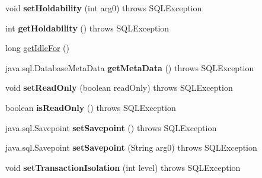 \begin{DoxyCompactItemize}
void {\bfseries set\+Holdability} (int arg0)  throws S\+Q\+L\+Exception 
\item 
\mbox{\label{classcom_1_1mysql_1_1cj_1_1jdbc_1_1_connection_wrapper_a830f2f6ec4a9c340bb0e1f45ea1190e4}} 
int {\bfseries get\+Holdability} ()  throws S\+Q\+L\+Exception 
\item 
long \mbox{\hyperlink{classcom_1_1mysql_1_1cj_1_1jdbc_1_1_connection_wrapper_a4894df9d353212ae8b4e0860c15e6a6e}{get\+Idle\+For}} ()
\item 
\mbox{\label{classcom_1_1mysql_1_1cj_1_1jdbc_1_1_connection_wrapper_ac3a18047b84616a9c5d751967464c880}} 
java.\+sql.\+Database\+Meta\+Data {\bfseries get\+Meta\+Data} ()  throws S\+Q\+L\+Exception 
\item 
\mbox{\label{classcom_1_1mysql_1_1cj_1_1jdbc_1_1_connection_wrapper_ae9150565f43b006b5f70ca1d966b2456}} 
void {\bfseries set\+Read\+Only} (boolean read\+Only)  throws S\+Q\+L\+Exception 
\item 
\mbox{\label{classcom_1_1mysql_1_1cj_1_1jdbc_1_1_connection_wrapper_ab2d583e2ce4875c55ce7b20f0cc655a0}} 
boolean {\bfseries is\+Read\+Only} ()  throws S\+Q\+L\+Exception 
\item 
\mbox{\label{classcom_1_1mysql_1_1cj_1_1jdbc_1_1_connection_wrapper_a0b5ee837ff9b67876252ab003c61bf98}} 
java.\+sql.\+Savepoint {\bfseries set\+Savepoint} ()  throws S\+Q\+L\+Exception 
\item 
\mbox{\label{classcom_1_1mysql_1_1cj_1_1jdbc_1_1_connection_wrapper_a53a034a2e55c89f1271ef8b87819daed}} 
java.\+sql.\+Savepoint {\bfseries set\+Savepoint} (String arg0)  throws S\+Q\+L\+Exception 
\item 
\mbox{\label{classcom_1_1mysql_1_1cj_1_1jdbc_1_1_connection_wrapper_a05b64dd17c2bdf5c3f95f514bf00bf90}} 
void {\bfseries set\+Transaction\+Isolation} (int level)  throws S\+Q\+L\+Exception 
\item 

\end{DoxyCompactItemize}
